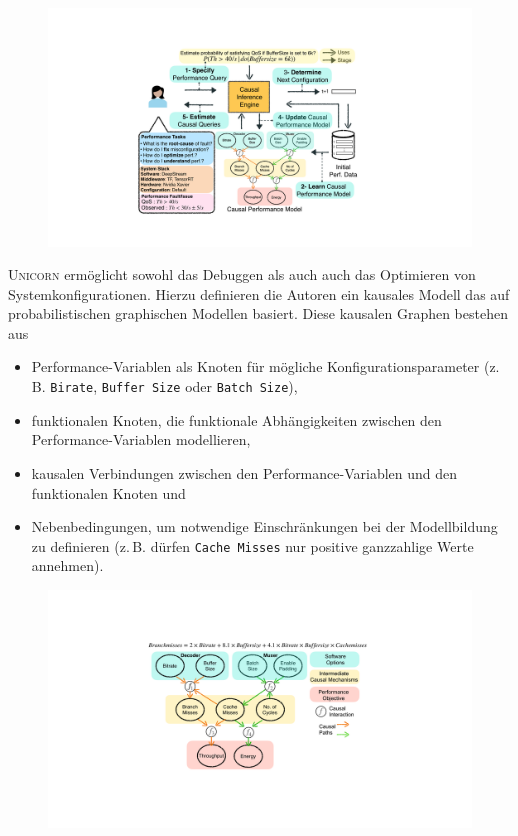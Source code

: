\documentclass[11pt]{article}
\begin{document}
\begin{figure}[tp!]
  \centering
  \includegraphics[width=\linewidth]{./img/UnicornOverview.pdf}
  \caption{\small {}}

  \label{}
\end{figure}

\textsc{Unicorn} ermöglicht sowohl das Debuggen als auch auch das Optimieren von Systemkonfigurationen. Hierzu definieren die Autoren ein kausales Modell das auf probabilistischen graphischen Modellen basiert. Diese kausalen Graphen bestehen aus

\begin{itemize}
  \itemsep0em
  \item Performance-Variablen als Knoten für mögliche Konfigurationsparameter (z.\,B. \texttt{Birate}, \texttt{Buffer Size} oder \texttt{Batch Size}),
  \item funktionalen Knoten, die funktionale Abhängigkeiten zwischen den Performance-Variablen modellieren,
  \item kausalen Verbindungen zwischen den Performance-Variablen und den funktionalen Knoten und
  \item Nebenbedingungen, um notwendige Einschränkungen bei der Modellbildung zu definieren (z.\,B. dürfen \texttt{Cache Misses} nur positive ganzzahlige Werte annehmen).
\end{itemize}

\begin{figure}[tp!]
  \centering
  \includegraphics[width=\linewidth]{./img/CausalModelExample.pdf}
  \caption{\small {}}

  \label{}
\end{figure}
\end{document}
